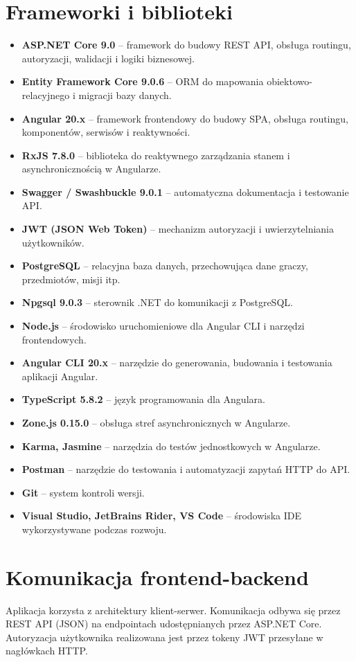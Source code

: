 \section{Frameworki i biblioteki}
\begin{itemize}
    \item \textbf{ASP.NET Core 9.0} -- framework do budowy REST API, obsługa routingu, autoryzacji, walidacji i logiki biznesowej.
    \item \textbf{Entity Framework Core 9.0.6} -- ORM do mapowania obiektowo-relacyjnego i migracji bazy danych.
    \item \textbf{Angular 20.x} -- framework frontendowy do budowy SPA, obsługa routingu, komponentów, serwisów i reaktywności.
    \item \textbf{RxJS 7.8.0} -- biblioteka do reaktywnego zarządzania stanem i asynchronicznością w Angularze.
    \item \textbf{Swagger / Swashbuckle 9.0.1} -- automatyczna dokumentacja i testowanie API.
    \item \textbf{JWT (JSON Web Token)} -- mechanizm autoryzacji i uwierzytelniania użytkowników.
    \item \textbf{PostgreSQL} -- relacyjna baza danych, przechowująca dane graczy, przedmiotów, misji itp.
    \item \textbf{Npgsql 9.0.3} -- sterownik .NET do komunikacji z PostgreSQL.
    \item \textbf{Node.js} -- środowisko uruchomieniowe dla Angular CLI i narzędzi frontendowych.
    \item \textbf{Angular CLI 20.x} -- narzędzie do generowania, budowania i testowania aplikacji Angular.
    \item \textbf{TypeScript 5.8.2} -- język programowania dla Angulara.
    \item \textbf{Zone.js 0.15.0} -- obsługa stref asynchronicznych w Angularze.
    \item \textbf{Karma, Jasmine} -- narzędzia do testów jednostkowych w Angularze.
    \item \textbf{Postman} -- narzędzie do testowania i automatyzacji zapytań HTTP do API.
    \item \textbf{Git} -- system kontroli wersji.
    \item \textbf{Visual Studio, JetBrains Rider, VS Code} -- środowiska IDE wykorzystywane podczas rozwoju.
\end{itemize}

\section{Komunikacja frontend-backend}
Aplikacja korzysta z architektury klient-serwer. Komunikacja odbywa się przez REST API (JSON) na endpointach udostępnianych przez ASP.NET Core. Autoryzacja użytkownika realizowana jest przez tokeny JWT przesyłane w nagłówkach HTTP.

